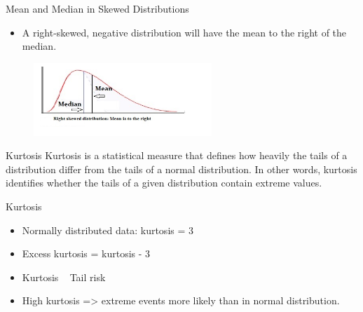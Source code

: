 \begin{frame}[t]{Mean and Median in Skewed Distributions}
	\begin{itemize}
		\item A right-skewed, negative distribution will have the mean to the 
		right of the median.
	\end{itemize}
	\begin{figure} [ht]
		\centering
		\includegraphics[width=0.6\textwidth]{eda/right-skewed.jpg}
	\end{figure}
\end{frame}

\begin{frame}[t]{Kurtosis}
Kurtosis is a statistical measure that defines how heavily the tails of a 
distribution differ from the tails of a normal distribution. In other words, 
kurtosis identifies whether the tails of a given distribution contain extreme 
values.
\end{frame}
\begin{frame}[t]{Kurtosis}
	\begin{itemize}
		\item Normally distributed data: kurtosis = 3
		\item Excess kurtosis = kurtosis - 3
		\item Kurtosis ~ Tail risk
		\item High kurtosis => extreme events more
		likely than in normal distribution.
	\end{itemize}
\end{frame}


